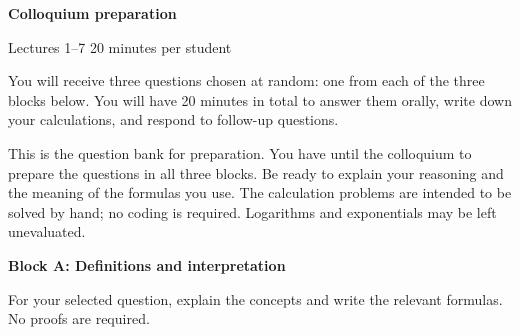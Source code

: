 \documentclass[11pt,a4paper]{article}
\newcommand{\blocktitle}[2]{{\Large\sffamily\bfseries\color{Ink}Block #1: #2}\par\vspace{5pt}}
\begin{document}
{\LARGE\sffamily\bfseries\color{Ink}Colloquium preparation}\par
{\sffamily Lectures 1--7 \hfill 20 minutes per student}
\vspace{3pt}

You will receive three questions chosen at random: one from each of the
three blocks below. You will have 20 minutes in total to answer them orally,
write down your calculations, and respond to follow-up questions.

This is the question bank for preparation. You have until the colloquium
to prepare the questions in all three blocks. Be ready to explain your
reasoning and the meaning of the formulas you use. The calculation problems
are intended to be solved by hand; no coding is required. Logarithms and
exponentials may be left unevaluated.

\blocktitle{A}{Definitions and interpretation}
For your selected question, explain the concepts and write the relevant
formulas. No proofs are required.
\end{document}
